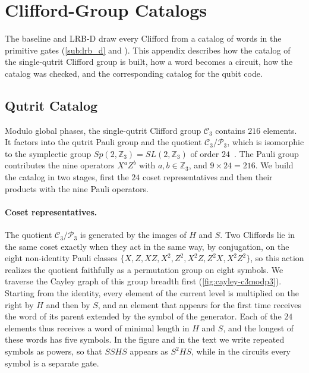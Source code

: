 \section{Clifford-Group Catalogs}
\label{sec:clifford-gen}

The baseline and LRB-D draw every Clifford from a catalog of words in the primitive gates (\autoref{sub:lrb_d} and ). This appendix describes how the catalog of the single-qutrit Clifford group is built, how a word becomes a circuit, how the catalog was checked, and the corresponding catalog for the qubit code.

\subsection{Qutrit Catalog}
\label{app:catalog-qutrit}

Modulo global phases, the single-qutrit Clifford group $\mathcal{C}_3$ contains $216$ elements. It factors into the qutrit Pauli group and the quotient $\mathcal{C}_3 / \mathcal{P}_3$, which is isomorphic to the symplectic group $Sp(2,\mathbb{Z}_3) = SL(2,\mathbb{Z}_3)$ of order $24$~\cite{Appleby2005,Hostens2005}. The Pauli group contributes the nine operators $X^a Z^b$ with $a,b \in \mathbb{Z}_3$, and $9 \times 24 = 216$. We build the catalog in two stages, first the $24$ coset representatives and then their products with the nine Pauli operators.

\paragraph{Coset representatives.}
The quotient $\mathcal{C}_3/\mathcal{P}_3$ is generated by the images of $H$ and $S$. Two Cliffords lie in the same coset exactly when they act in the same way, by conjugation, on the eight non-identity Pauli classes $\{X, Z, XZ, X^2, Z^2, X^2Z, Z^2X, X^2Z^2\}$, so this action realizes the quotient faithfully as a permutation group on eight symbols. We traverse the Cayley graph of this group breadth first (\autoref{fig:cayley-c3modp3}). Starting from the identity, every element of the current level is multiplied on the right by $H$ and then by $S$, and an element that appears for the first time receives the word of its parent extended by the symbol of the generator. Each of the $24$ elements thus receives a word of minimal length in $H$ and $S$, and the longest of these words has five symbols. In the figure and in the text we write repeated symbols as powers, so that $SSHS$ appears as $S^2HS$, while in the circuits every symbol is a separate gate.

